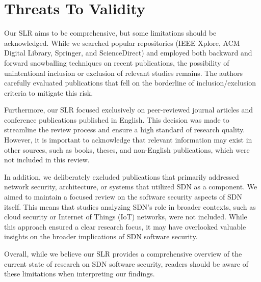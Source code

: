 \section{Threats To Validity}\label{sec:ttv}
Our SLR aims to be comprehensive, but some limitations should be acknowledged. While we searched popular repositories (IEEE Xplore, ACM Digital Library, Springer, and ScienceDirect) and employed both backward and forward snowballing techniques on recent publications, the possibility of unintentional inclusion or exclusion of relevant studies remains. The authors carefully evaluated publications that fell on the borderline of inclusion/exclusion criteria to mitigate this risk.

Furthermore, our SLR focused exclusively on peer-reviewed journal articles and conference publications published in English. This decision was made to streamline the review process and ensure a high standard of research quality. However, it is important to acknowledge that relevant information may exist in other sources, such as books, theses, and non-English publications, which were not included in this review.

In addition, we deliberately excluded publications that primarily addressed network security, architecture, or systems that utilized SDN as a component. We aimed to maintain a focused review on the software security aspects of SDN itself. This means that studies analyzing SDN's role in broader contexts, such as cloud security or Internet of Things (IoT) networks, were not included. While this approach ensured a clear research focus, it may have overlooked valuable insights on the broader implications of SDN software security.

Overall, while we believe our SLR provides a comprehensive overview of the current state of research on SDN software security, readers should be aware of these limitations when interpreting our findings.